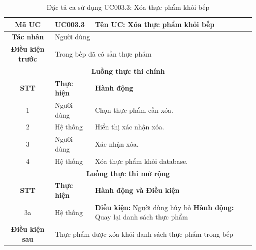 \begin{table}[H]
    \centering
    \label{tab:uc003-3}
    \begin{tabularx}{\textwidth}{|c|p{3.5cm}|X|}
        \hline
        \rowcolor{headergreen} 
        \textbf{Mã UC} & \textbf{UC003.3} & \textbf{Tên UC: Xóa thực phẩm khỏi bếp} \\ \hline
        \textbf{Tác nhân} & \multicolumn{2}{l|}{Người dùng} \\ \hline
        \textbf{Điều kiện trước} & \multicolumn{2}{X|}{Trong bếp đã có sẵn thực phẩm} \\ \hline
        
        \multicolumn{3}{|c|}{\cellcolor{headerorange}\textbf{Luồng thực thi chính}} \\ \hline
        \rowcolor{graybg} \textbf{STT} & \textbf{Thực hiện} & \textbf{Hành động} \\ \hline
        1 & Người dùng & Chọn thực phẩm cần xóa. \\ \hline
        2 & Hệ thống & Hiển thị xác nhận xóa. \\ \hline
        3 & Người dùng & Xác nhận xóa. \\ \hline
        4 & Hệ thống & Xóa thực phẩm khỏi database. \\ \hline
        
        \multicolumn{3}{|c|}{\cellcolor{headerorange}\textbf{Luồng thực thi mở rộng}} \\ \hline
        \rowcolor{graybg} \textbf{STT} & \textbf{Thực hiện} & \textbf{Hành động và Điều kiện} \\ \hline
        3a & Hệ thống & \textbf{Điều kiện:} Người dùng hủy bỏ \newline \textbf{Hành động:} Quay lại danh sách thực phẩm \\ \hline
        
        \textbf{Điều kiện sau} & \multicolumn{2}{X|}{Thực phẩm được xóa khỏi danh sách thực phẩm trong bếp} \\ \hline
    \end{tabularx}
    \caption{Đặc tả ca sử dụng UC003.3: Xóa thực phẩm khỏi bếp}
\end{table}

